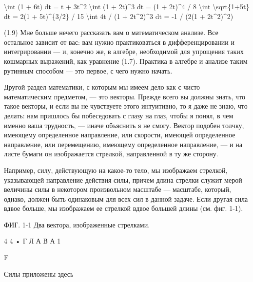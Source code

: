 \documentclass[10pt,oneside]{article}
\newcommand{\TipsRunning}[1]{\par\vspace{2bp}{\centering\footnotesize #1\par}\vspace{2bp}}
\newcommand{\TipsSubsection}[1]{\par\vspace{6bp}{\normalsize\bfseries #1\par}\vspace{2bp}}
\begin{document}
\textbackslash{}int (1 + 6t) dt = t + 3t\textasciicircum{}2 \textbackslash{}int (1 + 2t)\textasciicircum{}3 dt = (1 + 2t)\textasciicircum{}4 / 8 \textbackslash{}int \textbackslash{}sqrt\{1+5t\} dt = 2(1 + 5t)\textasciicircum{}\{3/2\} / 15 \textbackslash{}int 4t / (1 + 2t\textasciicircum{}2)\textasciicircum{}3 dt = -1 / (2(1 + 2t\textasciicircum{}2)\textasciicircum{}2)\par

\TipsRunning{П О Д Г О Т О В И Т Е Л Ь Н Ы Й  К У Р С • 4 3}

(1.9) Мне больше нечего рассказать вам о математическом анализе. Все остальное зависит от вас: вам нужно практиковаться в дифференцировании и интегрировании --- и, конечно же, в алгебре, необходимой для упрощения таких кошмарных выражений, как уравнение (1.7). Практика в алгебре и анализе таким рутинным способом --- это первое, с чего нужно начать.\par

\TipsSubsection{1-6 Векторы}

Другой раздел математики, с которым мы имеем дело как с чисто математическим предметом, --- это векторы. Прежде всего вы должны знать, что такое векторы, и если вы не чувствуете этого интуитивно, то я даже не знаю, что делать: нам пришлось бы побеседовать с глазу на глаз, чтобы я понял, в чем именно ваша трудность, --- иначе объяснить я не смогу. Вектор подобен толчку, имеющему определенное направление, или скорости, имеющей определенное направление, или перемещению, имеющему определенное направление, --- и на листе бумаги он изображается стрелкой, направленной в ту же сторону.\par

Например, силу, действующую на какое-то тело, мы изображаем стрелкой, указывающей направление действия силы, причем длина стрелки служит мерой величины силы в некотором произвольном масштабе --- масштабе, который, однако, должен быть одинаковым для всех сил в данной задаче. Если другая сила вдвое больше, мы изображаем ее стрелкой вдвое большей длины (см. фиг. 1-1).\par

ФИГ. 1-1 Два вектора, изображенные стрелками.\par

4 4 • Г Л А В А  1\par

F\par

Силы приложены здесь\par
\end{document}
